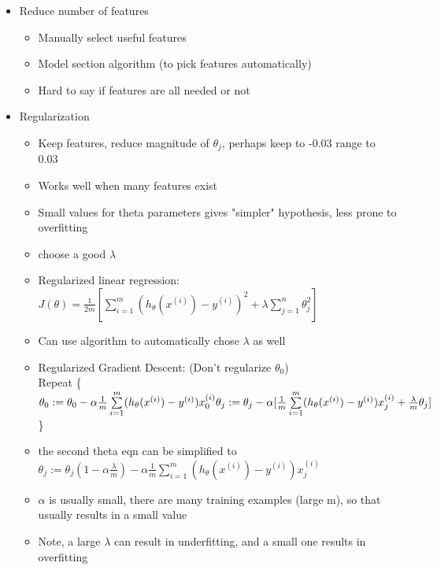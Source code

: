 \documentclass[]{article}
\begin{document}
\begin{itemize}
\item Reduce number of features
	\begin{itemize}
		\item Manually select useful features
		\item Model section algorithm (to pick features automatically)
		\item Hard to say if features are all needed or not
	\end{itemize}
\item Regularization
	\begin{itemize}
		\item Keep features, reduce magnitude of $\theta_j$, perhaps keep to -0.03 range to 0.03
		\item Works well when many features exist
		\item Small values for theta parameters gives "simpler" hypothesis, less prone to overfitting
		\item choose a good $\lambda$
		\item Regularized linear regression: $J(\theta) = \frac{1}{2m} [ \sum\limits_{i=1}^{m} (h_{\theta}(x^{(i)}) - y^{(i)})^2 + \lambda \sum\limits_{j=1}^{n} \theta_{j}^{2} ]$
		\item Can use algorithm to automatically chose $\lambda$ as well
		\item Regularized Gradient Descent: (Don't regularize $\theta_0$)\\
		Repeat \{\\
		$
		\theta_0 := \theta_0 - \alpha \frac{1}{m} \sum\limits_{i=1}^m (h_{\theta}(x^{(i)}) - y^{(i)})x_0^{(i)}\\
		\theta_j := \theta_j - \alpha [ \frac{1}{m} \sum\limits_{i=1}^m (h_{\theta}(x^{(i)}) - y^{(i)})x_j^{(i)} + \frac{\lambda}{m}\theta_j ]$\\
		\}
		
		\item the second theta eqn can be simplified to $\theta_j := \theta_j(1 - \alpha\frac{\lambda}{m}) - \alpha \frac{1}{m} \sum\limits_{i=1}^m (h_{\theta}(x^{(i)}) - y^{(i)})x_j^{(i)}$
		\item $\alpha$ is usually small, there are many training examples (large m),  so that usually results in a small value
		\item Note, a large $\lambda$ can result in underfitting, and a small one results in overfitting
	\end{itemize}
\end{itemize}
\end{document}
